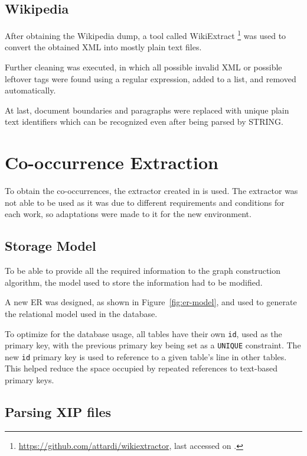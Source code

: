 \subsection{Wikipedia}

After obtaining the Wikipedia dump, a tool called WikiExtract
\footnote{\url{https://github.com/attardi/wikiextractor}, last accessed on
.} was used to convert the obtained \ac{XML} into mostly
plain text files.

Further cleaning was executed, in which all possible invalid \ac{XML} or
possible leftover tags were found using a regular expression, added to a list,
and removed automatically.

At last, document boundaries and paragraphs were replaced with unique
plain text identifiers which can be recognized even after being parsed by
\ac{STRING}.

\section{Co-occurrence Extraction}

To obtain the co-occurrences, the extractor created in \cite{correia2015syntax}
is used. The extractor was not able to be used as it was due to different
requirements and conditions for each work, so adaptations were made to it for
the new environment.

\subsection{Storage Model}

To be able to provide all the required information to the graph construction
algorithm, the model used to store the information had to be modified.

A new \ac{ER} was designed, as shown in Figure~\ref{fig:er-model}, and used to
generate the relational model used in the database.

To optimize for the database usage, all tables have their own \texttt{id},
used as the primary key, with the previous primary key being set as a
\texttt{UNIQUE} constraint. The new \texttt{id} primary key is used to reference
to a given table's line in other tables. This helped reduce the space occupied
by repeated references to text-based primary keys.

\subsection{Parsing \ac{XIP} files}

